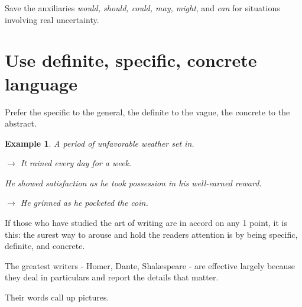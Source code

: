 \documentclass{book}
\numberwithin{equation}{section}
\newtheorem{example}{Example}[chapter]
\begin{document}
Save the auxiliaries \textit{would, should, could, may, might}, and \textit{can} for situations involving real uncertainty.

\section{Use definite, specific, concrete language}
Prefer the specific to the general, the definite to the vague, the concrete to the abstract.
\begin{example}
    A period of unfavorable weather set in.
    
    $\to$ It rained every day for a week.
    
    He showed satisfaction as he took possession in his well-earned reward.
    
    $\to$ He grinned as he pocketed the coin.
\end{example}
If those who have studied the art of writing are in accord on any 1 point, it is this: the surest way to arouse and hold the readers attention is by being specific, definite, and concrete.

The greatest writers - Homer, Dante, Shakespeare - are effective largely because they deal in particulars and report the details that matter.

Their words call up pictures.
\end{document}
